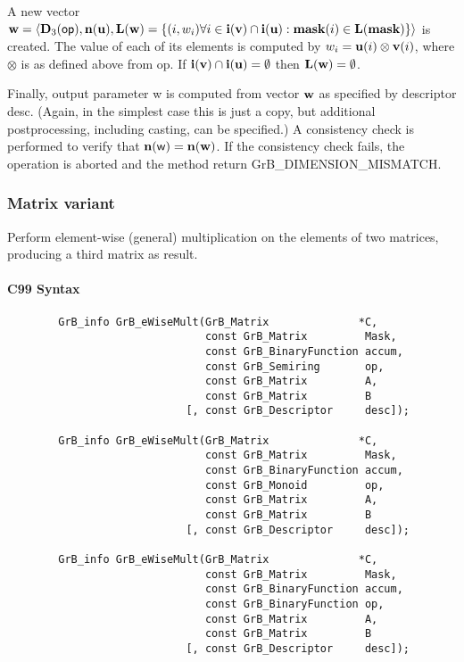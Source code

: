 A new vector ${\bf w} = \langle \bold{D}_3({\sf op}),
\bold{n}({\bf u}), \bold{L}({\bf w}) = \{(i,w_i)  \forall i \in
{\bf i}({\bf v}) \cap {\bf i}({\bf u}) : {\bf mask}(i)
\in \bold{L}({\bf mask}) \} \rangle$ is created.  The value of each of its
elements is computed by $w_i = {\bf u}(i) \otimes {\bf v}(i)$,
where $\otimes$ is as defined above from {\sf op}.
If ${\bf i}({\bf v}) \cap {\bf i}({\bf u}) = \emptyset$
then $\bold{L}({\bf w}) = \emptyset$.

Finally, output parameter {\sf w} is computed from vector ${\bf w}$
as specified by descriptor {\sf desc}. (Again, in the simplest case this
is just a copy, but additional postprocessing, including casting, can be specified.)  A consistency check is
performed to verify that $\bold{n}({\sf w}) = \bold{n}({\bf w})$. If
the consistency check fails, the operation is aborted and the method
return {\sf GrB\_DIMENSION\_MISMATCH}.


\subsubsection{Matrix variant}

Perform element-wise (general) multiplication on the elements of two matrices,
producing a third matrix as result.

\paragraph{C99 Syntax}

\begin{verbatim}
        GrB_info GrB_eWiseMult(GrB_Matrix              *C,
                               const GrB_Matrix         Mask,
                               const GrB_BinaryFunction accum,
                               const GrB_Semiring       op, 
                               const GrB_Matrix         A,
                               const GrB_Matrix         B
                            [, const GrB_Descriptor     desc]);
                            
        GrB_info GrB_eWiseMult(GrB_Matrix              *C,
                               const GrB_Matrix         Mask,
                               const GrB_BinaryFunction accum,
                               const GrB_Monoid         op, 
                               const GrB_Matrix         A,
                               const GrB_Matrix         B
                            [, const GrB_Descriptor     desc]);
                            
        GrB_info GrB_eWiseMult(GrB_Matrix              *C,
                               const GrB_Matrix         Mask,
                               const GrB_BinaryFunction accum,
                               const GrB_BinaryFunction op, 
                               const GrB_Matrix         A,
                               const GrB_Matrix         B
                            [, const GrB_Descriptor     desc]);
\end{verbatim}

